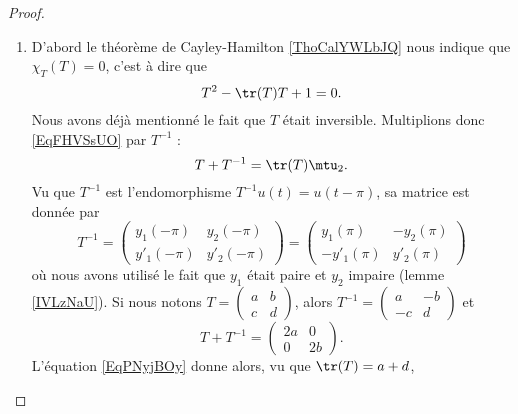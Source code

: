 \begin{proof}
\begin{enumerate}
        \item

            D'abord le théorème de Cayley-Hamilton \ref{ThoCalYWLbJQ} nous indique que \( \chi_T(T)=0\), c'est à dire que
            \begin{equation}    \label{EqFHVSsUO}
                T^2-\tr(T)T+1=0.
            \end{equation}
            Nous avons déjà mentionné le fait que \( T\) était inversible. Multiplions donc \eqref{EqFHVSsUO} par \( T^{-1}\) :
            \begin{equation}    \label{EqPNyjBOy}
                T+T^{-1}=\tr(T)\mtu_2.
            \end{equation}
            Vu que \( T^{-1}\) est l'endomorphisme \( T^{-1}u(t)=u(t-\pi)\), sa matrice est donnée par
            \begin{equation}
                T^{-1}=\begin{pmatrix}
                    y_1(-\pi)    &   y_2(-\pi)    \\ 
                    y'_1(-\pi)    &   y'_2(-\pi)    
                \end{pmatrix}=\begin{pmatrix}
                    y_1(\pi)    &   -y_2(\pi)    \\ 
                    -y'_1(\pi)    &   y'_2(\pi)    
                \end{pmatrix}
            \end{equation}
            où nous avons utilisé le fait que \( y_1\) était paire et \( y_2\) impaire (lemme \ref{IVLzNaU}). Si nous notons \( T=\begin{pmatrix}
                a    &   b    \\ 
                c    &   d    
            \end{pmatrix}\), alors \( T^{-1}=\begin{pmatrix}
                a    &   -b    \\ 
                -c    &   d    
            \end{pmatrix}\) et
            \begin{equation}
                T+T^{-1}=\begin{pmatrix}
                    2a    &     0  \\ 
                       0 &   2b    
                \end{pmatrix}.
            \end{equation}
            L'équation \eqref{EqPNyjBOy} donne alors, vu que \( \tr(T)=a+d\),

\end{enumerate}
\end{proof}
